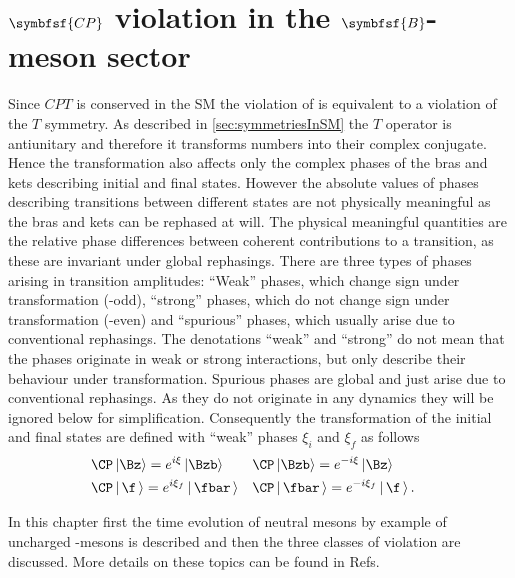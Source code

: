 \chapter[head={\CP violation in the $B$-meson sector},tocentry={$\symbfsf{C{}P}$ violation in the $\symbfsf{B}$-meson sector}]
{$\symbfsf{C{}P}$ violation in the $\symbfsf{B}$-meson sector}
\label{chap:CPV}

Since $CPT$ is conserved in the \ac{SM} the violation of \CP is equivalent to a violation of the $T$ symmetry.
As described in \cref{sec:symmetriesInSM} the $T$ operator is antiunitary and therefore it transforms numbers into their complex conjugate.
Hence the \CP transformation also affects only the complex phases of the bras and kets describing initial and final states.
However the absolute values of phases describing transitions between different states are not physically meaningful as the bras and kets can be rephased at will.
The physical meaningful quantities are the relative phase differences between coherent contributions to a transition, as these are invariant under global rephasings.
There are three types of phases arising in transition amplitudes:
\enquote{Weak} phases, which change sign under \CP transformation (\CP-odd), \enquote{strong} phases, which do not change sign under \CP transformation (\CP-even) and \enquote{spurious} phases, which usually arise due to conventional rephasings.
The denotations \enquote{weak} and \enquote{strong} do not mean that the phases originate in weak or strong interactions, but only describe their behaviour under \CP transformation.
Spurious phases are global and just arise due to conventional rephasings.
As they do not originate in any dynamics they will be ignored below for simplification.
Consequently the \CP transformation of the initial and final states are defined with \enquote{weak} phases $\xi_i$ and $\xi_f$ as follows
\begin{equation}
\begin{aligned}
&\CP\left|\Bz\right> =e^{i\xi}\left|\Bzb\right>&&\CP\left|\Bzb\right>=e^{-i\xi}\left|\Bz\right>&\\
&\CP\left|\,\f\,\right> =e^{i\xi_f}\left|\,\fbar\,\right>&&\CP\left|\,\fbar\,\right>=e^{-i\xi_f}\left|\,\f\,\right>.&
\end{aligned}
\end{equation}

In this chapter first the time evolution of neutral mesons by example of uncharged \B-mesons is described and then the three classes of \CP violation are discussed. More details on these topics can be found in Refs.~\cite{Branco:396964,Bigi:1295518}

